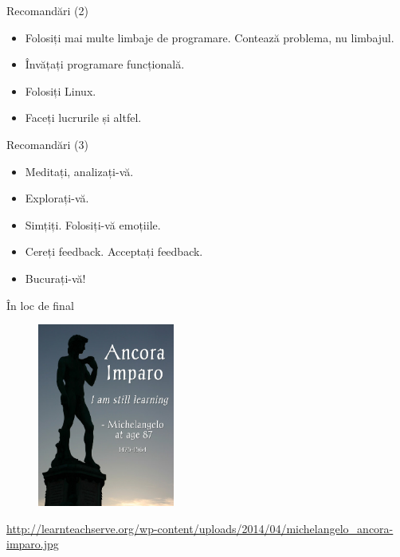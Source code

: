 \documentclass{simple}
\begin{document}
\begin{frame}{Recomandări (2)}
  \begin{itemize}
    \pause \item Folosiți mai multe limbaje de programare. Contează problema, nu limbajul.
    \pause \item Învățați programare funcțională.
    \pause \item Folosiți Linux.
    \pause \item Faceți lucrurile și altfel.
  \end{itemize}
\end{frame}

\begin{frame}{Recomandări (3)}
  \begin{itemize}
    \pause \item Meditați, analizați-vă.
    \pause \item Explorați-vă.
    \pause \item Simțiți. Folosiți-vă emoțiile.
    \pause \item Cereți feedback. Acceptați feedback.
    \pause \item Bucurați-vă!
  \end{itemize}
\end{frame}

\begin{frame}{În loc de final}
  \begin{figure}
    \centering
    \includegraphics[width=0.4\textwidth]{img/michelangelo-ancora-imparo.jpg}
  \end{figure}
  \begin{center}
    \tiny
    \url{http://learnteachserve.org/wp-content/uploads/2014/04/michelangelo_ancora-imparo.jpg}
  \end{center}
\end{frame}
\end{document}
